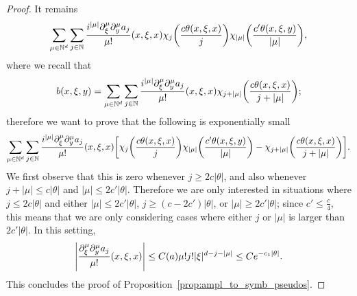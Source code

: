 \documentclass[10pt]{amsart}
\theoremstyle{definition}\newtheorem{defi}[theo]{Definition}\newtheorem{rema}[theo]{Remark}\newtheorem{exam}[theo]{Example}\newtheorem{exem}[theo]{Example}\newtheorem{nota}[theo]{Notation}
\newcommand\1{\mathds{1}}
\newcommand{\N}{\mathbb{N}}
\let\originalleft\left
\let\originalright\right
\renewcommand{\left}{\mathopen{}\mathclose\bgroup\originalleft}
\renewcommand{\right}{\aftergroup\egroup\originalright}
\begin{document}
\begin{proof}
It remains
\[
\sum_{\mu\in \N^d}\sum_{j\in
\N}\frac{i^{|\mu|}\partial_{\xi}^{\mu}\partial_y^{\mu}a_j}{\mu!}(x,\xi,x)\chi_j\left(\frac{c\theta(x,\xi,x)}{j}\right)\chi_{|\mu|}\left(\frac{c'\theta(x,\xi,y)}{|\mu|}\right),
\]
where we recall that
\[
b(x,\xi,y)=\sum_{\mu\in \N^d}\sum_{j\in
\N}\frac{i^{|\mu|}\partial_{\xi}^{\mu}\partial_y^{\mu}a_j}{\mu!}(x,\xi,x)\chi_{j+|\mu|}\left(\frac{c\theta(x,\xi,x)}{j+|\mu|}\right);
\]
therefore we want to prove that the following is exponentially small
\[
\sum_{\mu\in \N^d}\sum_{j\in
\N}\frac{i^{|\mu|}\partial_{\xi}^{\mu}\partial_y^{\mu}a_j}{\mu!}(x,\xi,x)\left[\chi_j\left(\frac{c\theta(x,\xi,x)}{j}\right)
\chi_{|\mu|}\left(\frac{c'\theta(x,\xi,y)}{|\mu|}\right)-\chi_{j+|\mu|}\left(\frac{c\theta(x,\xi,x)}{j+|\mu|}\right)\right].
\]
We first observe that this is zero whenever $j\geq 2c|\theta|$, and also whenever $j+|\mu|\leq c|\theta|$ and $|\mu|\leq 2c'|\theta|$. Therefore we are only interested in situations where $j\leq 2c|\theta|$ and either $|\mu|\leq 2c'|\theta|$, $j\geq (c-2c')|\theta|$, or $|\mu|\geq 2c'|\theta|$; since $c'\leq \frac c4$, this means that we are only considering cases where either $j$ or $|\mu|$ is larger than $2c'|\theta|$. In this setting,
\[
\left|\frac{\partial_{\xi}^{\mu}\partial_y^{\mu}a_j}{\mu!}(x,\xi,x)\right|\leq C(a)\mu!j!|\xi|^{d-j-|\mu|}\leq Ce^{-c_1|\theta|}.
\]
This concludes the proof of Proposition~\ref{prop:ampl_to_symb_pseudos}.
\end{proof}
\end{document}
